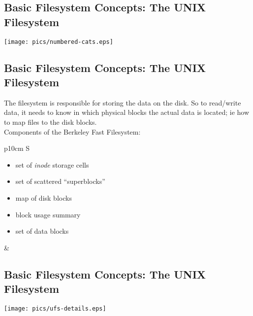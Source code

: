 \documentclass[xga]{xdvislides}
\begin{document}
\subsection{Basic Filesystem Concepts: The UNIX Filesystem}
\vspace*{\fill}
\begin{center}
\texttt{[image: pics/numbered-cats.eps]} \\
\end{center}
\vspace*{\fill}

\subsection{Basic Filesystem Concepts: The UNIX Filesystem}
The filesystem is responsible for storing the data on the disk.
So to read/write data, it needs to know in which physical blocks the actual
data is located; ie how to map files to the disk blocks.
\\

Components of the Berkeley Fast Filesystem:
\\

\begin{tabular}{ p{10cm} S }
\begin{itemize}
	\item set of {\em inode} storage cells
	\item set of scattered ``superblocks''
	\item map of disk blocks
	\item block usage summary
	\item set of data blocks
\end{itemize}
&  \\
\end{tabular}

\subsection{Basic Filesystem Concepts: The UNIX Filesystem}
\begin{center}
	\texttt{[image: pics/ufs-details.eps]} \\
\end{center}
\vspace*{\fill}
\end{document}
